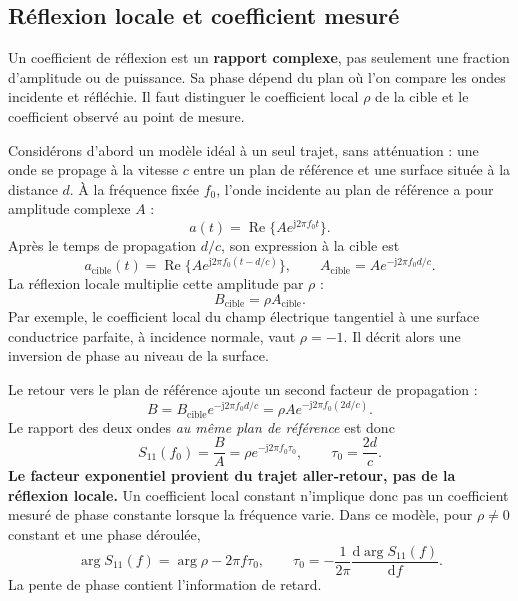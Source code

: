 \documentclass[11pt,a4paper]{article}
\newcommand{\jj}{\mathrm{j}}
\newcommand{\Reel}{\operatorname{Re}}
\begin{document}
\subsection{Réflexion locale et coefficient mesuré}
Un coefficient de réflexion est un \textbf{rapport complexe}, pas seulement
une fraction d'amplitude ou de puissance. Sa phase dépend du plan où l'on
compare les ondes incidente et réfléchie. Il faut distinguer le coefficient
local $\rho$ de la cible et le coefficient observé au point de mesure.

Considérons d'abord un modèle idéal à un seul trajet, sans atténuation :
une onde se propage à la vitesse $c$ entre un plan de référence et une
surface située à la distance $d$. À la fréquence fixée $f_0$, l'onde
incidente au plan de référence a pour amplitude complexe $A$ :
\begin{equation}
 a(t)=\Reel\{A e^{\jj2\pi f_0t}\}.
\end{equation}
Après le temps de propagation $d/c$, son expression à la cible est
\begin{equation}
 a_{\mathrm{cible}}(t)
 =\Reel\{A e^{\jj2\pi f_0(t-d/c)}\},
 \qquad A_{\mathrm{cible}}=A e^{-\jj2\pi f_0d/c}.
\end{equation}
La réflexion locale multiplie cette amplitude par $\rho$ :
\begin{equation}
 B_{\mathrm{cible}}=\rho A_{\mathrm{cible}}.
\end{equation}
Par exemple, le coefficient local du champ électrique tangentiel à une
surface conductrice parfaite, à incidence normale, vaut $\rho=-1$.
Il décrit alors une inversion de phase au niveau de la surface.

Le retour vers le plan de référence ajoute un second facteur de propagation :
\begin{equation}
 B=B_{\mathrm{cible}} e^{-\jj2\pi f_0d/c}
 =\rho A e^{-\jj2\pi f_0(2d/c)}.
\end{equation}
Le rapport des deux ondes \emph{au même plan de référence} est donc
\begin{equation}
 \boxed{S_{11}(f_0)=\frac BA
 =\rho e^{-\jj2\pi f_0\tau_0},\qquad \tau_0=\frac{2d}{c}.}
\end{equation}
\textbf{Le facteur exponentiel provient du trajet aller-retour, pas de
la réflexion locale.} Un coefficient local constant n'implique donc pas
un coefficient mesuré de phase constante lorsque la fréquence varie.
Dans ce modèle, pour $\rho\ne0$ constant et une phase déroulée,
\begin{equation}
 \arg S_{11}(f)=\arg\rho-2\pi f\tau_0,\qquad
 \tau_0=-\frac{1}{2\pi}\frac{\mathrm d\arg S_{11}(f)}{\mathrm df}.
\end{equation}
La pente de phase contient l'information de retard.
\end{document}
